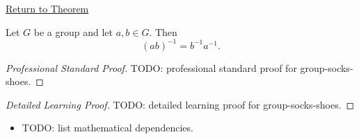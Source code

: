 \newpage
{}
\label{prf:group-socks-shoes}

\begin{remark*}[Return]
\hyperref[prop:group-socks-shoes]{Return to Theorem}
\end{remark*}

\begin{proposition*}
Let $G$ be a group and let $a, b \in G$. Then
\[
(ab)^{-1} = b^{-1} a^{-1}.
\]
\end{proposition*}

\begin{proof}[Professional Standard Proof]
\LRAProofBodyStart
TODO: professional standard proof for group-socks-shoes.
\end{proof}

\begin{proof}[Detailed Learning Proof]
\LRAProofBodyStart
TODO: detailed learning proof for group-socks-shoes.
\end{proof}

\begin{remark*}
\end{remark*}

\begin{dependencies}
\begin{itemize}
  \item TODO: list mathematical dependencies.
\end{itemize}
\end{dependencies}

\clearpage

